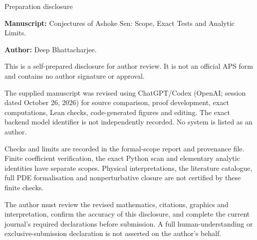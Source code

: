 \documentclass[11pt]{article}
\begin{document}
\begin{center}\Large Preparation disclosure\end{center}
\noindent\textbf{Manuscript:} Conjectures of Ashoke Sen: Scope, Exact Tests and Analytic Limits.\par
\noindent\textbf{Author:} Deep Bhattacharjee.\par\medskip
This is a self-prepared disclosure for author review. It is not an official APS form and contains no author signature or approval.

The supplied manuscript was revised using ChatGPT/Codex (OpenAI; session dated October 26, 2026) for source comparison, proof development, exact computations, Lean checks, code-generated figures and editing. The exact backend model identifier is not independently recorded. No system is listed as an author.

Checks and limits are recorded in the formal-scope report and provenance file. Finite coefficient verification, the exact Python scan and elementary analytic identities have separate scopes. Physical interpretations, the literature catalogue, full PDE formalisation and nonperturbative closure are not certified by these finite checks.

The author must review the revised mathematics, citations, graphics and interpretation, confirm the accuracy of this disclosure, and complete the current journal's required declarations before submission. A full human-understanding or exclusive-submission declaration is not asserted on the author's behalf.
\end{document}
